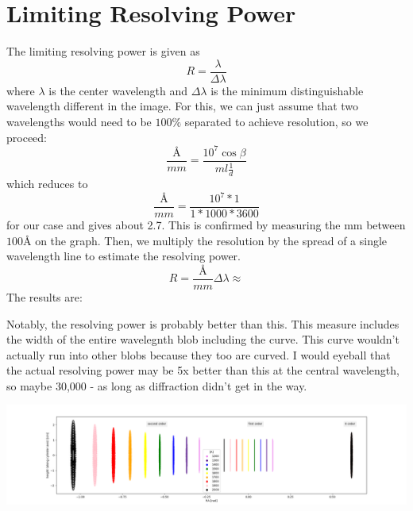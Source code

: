 \documentclass{article}
\begin{document}
\section{Limiting Resolving Power}
The limiting resolving power is given as
\begin{equation}
    \label{eq:resolve}
    R = \frac{\lambda}{\Delta \lambda}
\end{equation}
where $\lambda$ is the center wavelength and $\Delta \lambda$ is the minimum distinguishable wavelength different in the image.  For this, we can just assume that two wavelengths would need to be $100\%$ separated to achieve resolution, so we proceed:
\begin{equation}
    \label{eq:Amm}
    \frac{\si{\angstrom}}{mm} = \frac{10^7\cos{\beta}}{ml\frac{1}{d}}
\end{equation} which reduces to
\begin{equation}
    \label{eq:Ammred}
    \frac{\si{\angstrom}}{mm} = \frac{10^7 * 1}{1 * 1000 * 3600}
\end{equation} for our case and gives about 2.7. This is confirmed by measuring the mm between $100 \si{\angstrom}$ on the graph. Then, we multiply the resolution by the spread of a single wavelength line to estimate the resolving power.
\begin{equation}
    \label{eq:resolvingPower}
    R = \frac{\si{\angstrom}}{mm} \Delta \lambda \approx
\end{equation} The results are:
\begin{center}
    
\end{center}
Notably, the resolving power is probably better than this. This measure includes the width of the entire wavelegnth blob including the curve. This curve wouldn't actually run into other blobs because they too are curved. I would eyeball that the actual resolving power may be 5x better than this at the central wavelength, so maybe 30,000 - as long as diffraction didn't get in the way.

\eject \pdfpagewidth=22.5in \pdfpageheight=7.5in
\includegraphics{figures/spectrum.png}


% 
\end{document}
